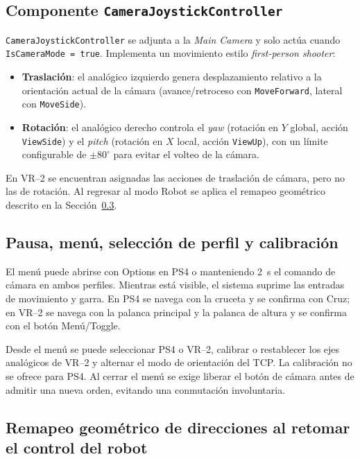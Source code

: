 \subsection{Componente \texttt{CameraJoystickController}}

\texttt{CameraJoystickController} se adjunta a la \emph{Main Camera} y solo
actúa cuando \texttt{IsCameraMode = true}. Implementa un movimiento estilo
\emph{first-person shooter}:

\begin{itemize}
    \item \textbf{Traslación}: el analógico izquierdo genera desplazamiento
          relativo a la orientación actual de la cámara (avance/retroceso con
          \texttt{MoveForward}, lateral con \texttt{MoveSide}).
    \item \textbf{Rotación}: el analógico derecho controla el \emph{yaw}
          (rotación en $Y$ global, acción \texttt{ViewSide}) y el \emph{pitch}
          (rotación en $X$ local, acción \texttt{ViewUp}), con un límite
          configurable de $\pm 80^{\circ}$ para evitar el volteo de la cámara.
\end{itemize}

En VR--2 se encuentran asignadas las acciones de traslación de cámara, pero no las
de rotación. Al regresar al modo Robot se aplica el remapeo geométrico descrito en
la Sección~\ref{sec:remap}.

\subsection{Pausa, menú, selección de perfil y calibración}

El menú puede abrirse con Options en PS4 o manteniendo \SI{2}{\second} el comando
de cámara en ambos perfiles. Mientras está visible, el sistema suprime las
entradas de movimiento y garra. En PS4 se navega con la cruceta y se confirma con
Cruz; en VR--2 se navega con la palanca principal y la palanca de altura y se
confirma con el botón Menú/Toggle.

Desde el menú se puede seleccionar PS4 o VR--2, calibrar o restablecer los ejes
analógicos de VR--2 y alternar el modo de orientación del TCP. La calibración no
se ofrece para PS4. Al cerrar el menú se exige liberar el botón de cámara antes de
admitir una nueva orden, evitando una conmutación involuntaria.

\subsection{Remapeo geométrico de direcciones al retomar el control del robot}
\label{sec:remap}

